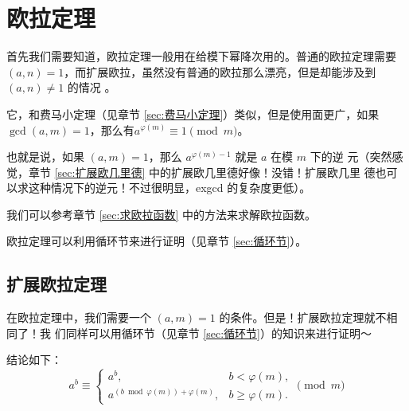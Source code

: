 \section{欧拉定理} \label{sec:欧拉定理}
首先我们需要知道，欧拉定理一般用在给模下幂降次用的。普通的欧拉定理需要 $(a, n) =
1$，而扩展欧拉，虽然没有普通的欧拉那么漂亮，但是却能涉及到 $(a, n) \ne 1$ 的情况
。

它，和费马小定理（见章节 \ref{sec:费马小定理}）类似，但是使用面更广，如果
$\gcd(a, m) = 1$，那么有$a^{\varphi(m)} \equiv 1 \pmod m$。

也就是说，如果 $(a, m) = 1$，那么 $a^{\varphi(m) - 1}$ 就是 $a$ 在模 $m$ 下的逆
元（突然感觉，章节 \ref{sec:扩展欧几里德} 中的扩展欧几里德好像！没错！扩展欧几里
德也可以求这种情况下的逆元！不过很明显，exgcd 的复杂度更低）。

我们可以参考章节 \ref{sec:求欧拉函数} 中的方法来求解欧拉函数。

欧拉定理可以利用循环节来进行证明（见章节 \ref{sec:循环节}）。

\subsection{扩展欧拉定理} \label{subsec:扩展欧拉定理}
在欧拉定理中，我们需要一个 $(a, m) = 1$ 的条件。但是！扩展欧拉定理就不相同了！我
们同样可以用循环节（见章节 \ref{sec:循环节}）的知识来进行证明～

结论如下：\[
    a^b \equiv \begin{cases}
        a^b,                                     & b < \varphi(m), \\
        a^{(b \bmod \varphi(m)) + \varphi(m)},   & b \ge \varphi(m).
    \end{cases}
    \pmod m
\]
